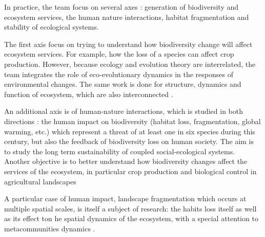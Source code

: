 \documentclass{article}
\begin{document}
In practice, the team focus on several axes : generation of biodiversity and ecosystem services, the human nature interactions, habitat fragmentation and stability of ecological systems.

The first axis focus on trying to understand how biodiversity change will affect ecosystem services. For example, how the loss of a species can affect crop production. However, because ecology and evolution theory are interrelated, the team integrates the role of eco-evolutionary dynamics in the responses of environmental changes. The same work is done for structure, dynamics and function of ecosystem, which are also interconnected \citep{bastazini_loss_2017} \cite{bideault_temperature_2019} \cite{galiana_geographical_2019}.



An additional axis is of human-nature interactions, which is studied in both directions : the human impact on biodiversity (habitat loss, fragmentation, global warming, etc.) which represent a threat of at least one in six species during this century, but also the feedback of biodiversity loss on human society. The aim is to study the long term sustainability of coupled social-ecological systems. Another objective is to better understand how biodiversity changes affect the services of the ecosystem, in particular  crop production and biological control in agricultural landscapes \cite{cazalis_we_2018} \cite{lafuite_sustainable_2018} \cite{montoya_trade-offs_2018} \cite{montoya_tradeoffs_2019}

A particular case of human impact, landscape fragmentation which occurs at multiple spatial scales, is itself a subject of research: the habits loss itself as well as its effect ton he spatial dynamics of the ecosystem, with a special attention to metacommunities dynamics \cite{goncalves_habitat_2018} \cite{jacobi_operationalizing_2018}.
\end{document}
